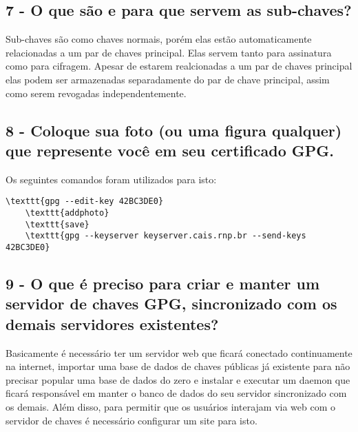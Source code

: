 \documentclass[
    article,            %
    11pt,               %
    oneside,            %
    a4paper,            %
    english,            %
    brazil,             %
    sumario=tradicional,
    ]{abntex2}
\begin{document}
\subsection*{\textbf{7 - O que são e para que servem as sub-chaves?}}

Sub-chaves são como chaves normais, porém elas estão automaticamente relacionadas a um par de chaves principal. Elas servem tanto para assinatura como para cifragem. Apesar de estarem realcionadas a um par de chaves principal elas podem ser armazenadas separadamente do par de chave principal, assim como serem revogadas independentemente.

\subsection*{\textbf{8 - Coloque sua foto (ou uma figura qualquer) que represente você em seu certificado GPG.}}

Os seguintes comandos foram utilizados para isto: 
\begin{Verbatim}[commandchars=\\\{\}, fontsize=\footnotesize]
    \texttt{gpg --edit-key 42BC3DE0}
    \texttt{addphoto}
    \texttt{save}
    \texttt{gpg --keyserver keyserver.cais.rnp.br --send-keys 42BC3DE0}
\end{Verbatim}


\subsection*{\textbf{9 - O que é preciso para criar e manter um servidor de chaves GPG, sincronizado com os demais servidores existentes?}}

Basicamente é necessário ter um servidor web que ficará conectado continuamente na internet, importar uma base de dados de chaves públicas já existente para não precisar popular uma base de dados do zero e instalar e executar um daemon que ficará responsável em manter o banco de dados do seu servidor sincronizado com os demais. Além disso, para permitir que os usuários interajam via web com o servidor de chaves é necessário configurar um site para isto.
\end{document}
